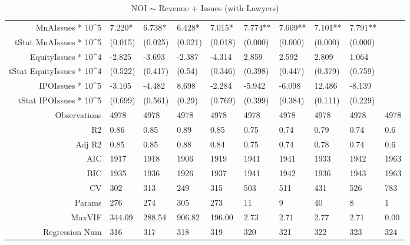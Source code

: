 \begin{table}[ht]
\begin{tabular}{rlllllllll}
  MnAIssues * 10^5 & 7.220* & 6.738* & 6.428* & 7.015* & 7.774** & 7.609** & 7.101** & 7.791** &  \\ 
  tStat MnAIssues * 10^5 & (0.015) & (0.025) & (0.021) & (0.018) & (0.000) & (0.000) & (0.000) & (0.000) &  \\ 
  EquityIssues * 10^4 & -2.825 & -3.693 & -2.387 & -4.314 & 2.859 & 2.592 & 2.809 & 1.064 &  \\ 
  tStat EquityIssues * 10^4 & (0.522) & (0.417) & (0.54) & (0.346) & (0.398) & (0.447) & (0.379) & (0.759) &  \\ 
  IPOIssues * 10^5 & -3.105 & -4.482 & 8.698 & -2.284 & -5.942 & -6.098 & 12.486 & -8.139 &  \\ 
  tStat IPOIssues * 10^5 & (0.699) & (0.561) & (0.29) & (0.769) & (0.399) & (0.384) & (0.111) & (0.229) &  \\ 
  Observations & 4978 & 4978 & 4978 & 4978 & 4978 & 4978 & 4978 & 4978 & 4978 \\ 
  R2 & 0.86 & 0.85 & 0.89 & 0.85 & 0.75 & 0.74 & 0.79 & 0.74 & 0.6 \\ 
  Adj R2 & 0.85 & 0.85 & 0.88 & 0.84 & 0.75 & 0.74 & 0.78 & 0.74 & 0.6 \\ 
  AIC & 1917 & 1918 & 1906 & 1919 & 1941 & 1941 & 1933 & 1942 & 1963 \\ 
  BIC & 1935 & 1936 & 1926 & 1937 & 1941 & 1942 & 1936 & 1943 & 1963 \\ 
  CV & 302 & 313 & 249 & 315 & 503 & 511 & 431 & 526 & 783 \\ 
  Params & 276 & 274 & 305 & 273 & 11 & 9 & 40 & 8 & 1 \\ 
  MaxVIF & 344.09 & 288.54 & 906.82 & 196.00 & 2.73 & 2.71 & 2.77 & 2.71 & 0.00 \\ 
  Regression Num & 316 & 317 & 318 & 319 & 320 & 321 & 322 & 323 & 324 \\ 
   \hline
\end{tabular}
\caption{NOI $\sim$ Revenue + Issues (with Lawyers)} 
\end{table}
